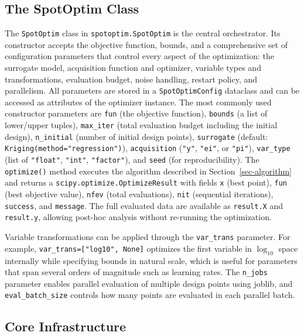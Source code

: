 \documentclass[
  twocolumn]{article}
\begin{document}
\subsection{The SpotOptim Class}\label{sec-spotoptim-class}

The \texttt{SpotOptim} class in \texttt{spotoptim.SpotOptim} is the
central orchestrator. Its constructor accepts the objective function,
bounds, and a comprehensive set of configuration parameters that control
every aspect of the optimization: the surrogate model, acquisition
function and optimizer, variable types and transformations, evaluation
budget, noise handling, restart policy, and parallelism. All parameters
are stored in a \texttt{SpotOptimConfig} dataclass and can be accessed
as attributes of the optimizer instance. The most commonly used
constructor parameters are \texttt{fun} (the objective function),
\texttt{bounds} (a list of lower/upper tuples), \texttt{max\_iter}
(total evaluation budget including the initial design),
\texttt{n\_initial} (number of initial design points),
\texttt{surrogate} (default: \texttt{Kriging(method="regression")}),
\texttt{acquisition} (\texttt{"y"}, \texttt{"ei"}, or \texttt{"pi"}),
\texttt{var\_type} (list of \texttt{"float"}, \texttt{"int"},
\texttt{"factor"}), and \texttt{seed} (for reproducibility). The
\texttt{optimize()} method executes the algorithm described in
Section~\ref{sec-algorithm} and returns a
\texttt{scipy.optimize.OptimizeResult} with fields \texttt{x} (best
point), \texttt{fun} (best objective value), \texttt{nfev} (total
evaluations), \texttt{nit} (sequential iterations), \texttt{success},
and \texttt{message}. The full evaluated data are available as
\texttt{result.X} and \texttt{result.y}, allowing post-hoc analysis
without re-running the optimization.

Variable transformations can be applied through the \texttt{var\_trans}
parameter. For example, \texttt{var\_trans={[}"log10",\ None{]}}
optimizes the first variable in \(\log_{10}\) space internally while
specifying bounds in natural scale, which is useful for parameters that
span several orders of magnitude such as learning rates. The
\texttt{n\_jobs} parameter enables parallel evaluation of multiple
design points using joblib, and \texttt{eval\_batch\_size} controls how
many points are evaluated in each parallel batch.

\subsection{Core Infrastructure}\label{sec-core}
\end{document}
